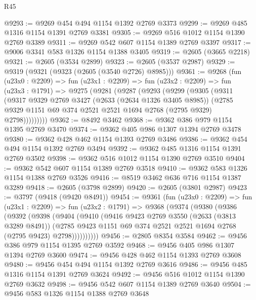 \begin{lexlean}{R45}
\begin{coremodule}
@9293 := @9269 @454 @494 @1154 @1392 @2769 @3373
@9299 := @9269 @485 @1316 @1154 @1391 @2769 @3381
@9305 := @9269 @516 @1012 @1154 @1390 @2769 @3389
@9311 := @9269 @542 @607 @1154 @1389 @2769 @3397
@9317 := @9006 @3341 @583 @1326 @1154 @1388 @3405
@9319 := @2605 (@3665 @2218)
@9321 := @2605 (@3534 @2899)
@9323 := @2605 (@3537 @2987)
@9329 := @9319 (@9321 (@9323 (@2605 (@3540 @2726) @8985)))
@9361 := @9268
    (fun (u23x0 : @2209) =>
    fun (u23x1 : @2209) =>
    fun (u23x2 : @2209) =>
    fun (u23x3 : @1791) =>
    @9275
      (@9281
        (@9287
          (@9293
            (@9299
              (@9305
                (@9311
                  (@9317
                    @9329
                    @2769
                    @3427
                    (@2633 (@2634 @1326 @3405 @8985))
                    (@2785 @9329 @1151 @69 @374 @2521 @2521 @1694 @2768 (@2795 @9329) @2798)))))))))
@9362 := @8492 @3462
@9368 := @9362 @386 @979 @1154 @1395 @2769 @3470
@9374 := @9362 @405 @986 @1307 @1394 @2769 @3478
@9380 := @9362 @428 @462 @1154 @1393 @2769 @3486
@9386 := @9362 @454 @494 @1154 @1392 @2769 @3494
@9392 := @9362 @485 @1316 @1154 @1391 @2769 @3502
@9398 := @9362 @516 @1012 @1154 @1390 @2769 @3510
@9404 := @9362 @542 @607 @1154 @1389 @2769 @3518
@9410 := @9362 @583 @1326 @1154 @1388 @2769 @3526
@9416 := @8519 @3462 @636 @716 @1154 @1387 @3289
@9418 := @2605 (@3798 @2899)
@9420 := @2605 (@3801 @2987)
@9423 := @3797 (@9418 (@9420 @8491))
@9454 := @9361
    (fun (u23x0 : @2209) =>
    fun (u23x1 : @2209) =>
    fun (u23x2 : @1791) =>
    @9368
      (@9374
        (@9380
          (@9386
            (@9392
              (@9398
                (@9404
                  (@9410
                    (@9416
                      @9423
                      @2769
                      @3550
                      (@2633 (@3813 @3289 @8491))
                      (@2785
                        @9423
                        @1151
                        @69
                        @374
                        @2521
                        @2521
                        @1694
                        @2768
                        (@2795 @9423)
                        @2798))))))))))
@9456 := @2805 @8354 @3584
@9462 := @9456 @386 @979 @1154 @1395 @2769 @3592
@9468 := @9456 @405 @986 @1307 @1394 @2769 @3600
@9474 := @9456 @428 @462 @1154 @1393 @2769 @3608
@9480 := @9456 @454 @494 @1154 @1392 @2769 @3616
@9486 := @9456 @485 @1316 @1154 @1391 @2769 @3624
@9492 := @9456 @516 @1012 @1154 @1390 @2769 @3632
@9498 := @9456 @542 @607 @1154 @1389 @2769 @3640
@9504 := @9456 @583 @1326 @1154 @1388 @2769 @3648

\end{coremodule}
\end{lexlean}
